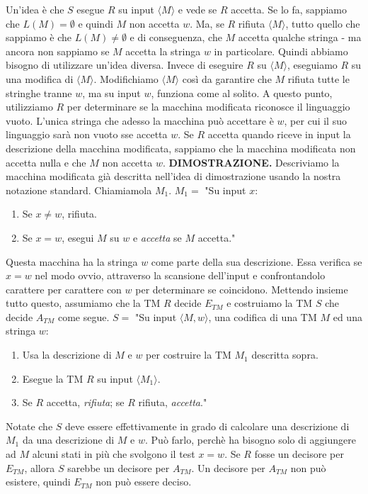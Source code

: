 \documentclass{article}
\begin{document}
Un'idea è che $S$ esegue $R$ su input $\langle M \rangle$ e vede se $R$ accetta.
Se lo fa, sappiamo che $L(M) = \emptyset$ e quindi $M$ non accetta $w$.
Ma, se $R$ rifiuta $\langle M \rangle$, tutto quello che sappiamo è che $L(M) \neq \emptyset$ e di conseguenza, che $M$ accetta qualche stringa - ma ancora non sappiamo se $M$ accetta la stringa $w$ in particolare.
Quindi abbiamo bisogno di utilizzare un'idea diversa.
Invece di eseguire $R$ su $\langle M \rangle$, eseguiamo $R$ su una modifica di $\langle M \rangle$.
Modifichiamo $\langle M \rangle$ così da garantire che $M$ rifiuta tutte le stringhe tranne $w$, ma su input $w$, funziona come al solito.
A questo punto, utilizziamo $R$ per determinare se la macchina modificata riconosce il linguaggio vuoto.
L'unica stringa che adesso la macchina può accettare è $w$, per cui il suo linguaggio sarà non vuoto sse accetta $w$.
Se $R$ accetta quando riceve in input la descrizione della macchina modificata, sappiamo che la macchina modificata non accetta nulla e che $M$ non accetta $w$.
\vspace{1em}
\text{}
\newline
\hbox{\textbf{DIMOSTRAZIONE.}}
Descriviamo la macchina modificata già descritta nell'idea di dimostrazione usando la nostra notazione standard.
Chiamiamola $M_1$.
\vspace{1em}
\text{}
\newline
$M_1 =$ "Su input $x$:
\begin{enumerate}
    \item Se $x \neq w$, rifiuta.
    \item Se $x = w$, esegui $M$ su $w$ e \textit{accetta} se $M$ accetta."
\end{enumerate}
\vspace{1em}
\text{}
\newline
Questa macchina ha la stringa $w$ come parte della sua descrizione.
Essa verifica se $x = w$ nel modo ovvio, attraverso la scansione dell'input e confrontandolo carattere per carattere con $w$ per determinare se coincidono.
Mettendo insieme tutto questo, assumiamo che la TM $R$ decide $E_{TM}$ e costruiamo la TM $S$ che decide $A_{TM}$ come segue.
\vspace{1em}
\text{}
\newline
$S = $ "Su input $\langle M,w \rangle$, una codifica di una TM $M$ ed una stringa $w$:
\begin{enumerate}
    \item Usa la descrizione di $M$ e $w$ per costruire la TM $M_1$ descritta sopra.
    \item Esegue la TM $R$ su input $\langle M_1 \rangle$.
    \item Se $R$ accetta, \textit{rifiuta}; se $R$ rifiuta, \textit{accetta}."
\end{enumerate}
Notate che $S$ deve essere effettivamente in grado di calcolare una descrizione di $M_1$ da una descrizione di $M$ e $w$.
Può farlo, perchè ha bisogno solo di aggiungere ad $M$ alcuni stati in più che svolgono il test $x = w$.
Se $R$ fosse un decisore per $E_{TM}$, allora $S$ sarebbe un decisore per $A_{TM}$.
Un decisore per $A_{TM}$ non può esistere, quindi $E_{TM}$ non può essere deciso.
\newpage
\end{document}
